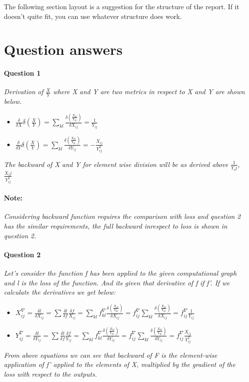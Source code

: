 \documentclass[a4 paper]{article}
\begin{document}

The following section layout is a suggestion for the structure of the report. If it doesn't quite fit, you can use whatever structure does work.

\section{Question answers}
\paragraph{Question 1} \textit{Derivation of $\frac{X}{Y}$ where X and Y are two metrics in respect to X and Y are shown below.}
\begin{itemize}
    \item $\frac{\delta}{\delta X} \delta(\frac{X}{Y}) = \sum_{kl} \frac{\delta(\frac{X_{kl}}{Y_{kl}})}{\delta X_{ij}} = \frac{1}{Y_{ij}}$
    \item $\frac{\delta}{\delta Y} \delta(\frac{X}{Y}) = \sum_{kl} \frac{\delta(\frac{X_{kl}}{Y_{kl}})}{\delta Y_{ij}} = - \frac{X_{ij}}{Y_{ij}^2}$
\end{itemize}
\textit{The backward of X and Y for element wise division will be as derived above $\frac{1}{Y_ij}$, $\frac{X_ij}{Y_{ij}^2}$}
\paragraph{Note:} \textit{Considering backward function requires the comparison with loss and question 2 has the similar requirements, the full backward inrespect to loss is shown in question 2. }
\paragraph{Question 2} \textit{Let's consider the function \emph{f} has been applied to the given computational graph and \emph{l} is the loss of the function. And its given that derivative of \emph{f} if \emph{f'}. If we calculate the derivatives we get below:}
\begin{itemize}
    \item $X_{ij}^\nabla = \frac{\delta l}{\delta X_{ij}} = \sum \frac{\delta l}{\delta f} \frac{\delta f}{X_{ij}} = \sum_{kl} f_{kl}^\nabla \frac{\delta(\frac{X_{kl}}{Y_{kl}})}{\delta X_{ij}} =  f_{ij}^\nabla  \sum_{kl} \frac{\delta(\frac{X_{kl}}{Y_{kl}})}{\delta X_{ij}} = f_{ij}^\nabla \frac{1}{Y_{ij}} $
    \item $Y_{ij}^\nabla = \frac{\delta l}{\delta Y_{ij}} = \sum \frac{\delta l}{\delta f} \frac{\delta f}{Y_{ij}} = \sum_{kl} f_{kl}^\nabla \frac{\delta(\frac{X_{kl}}{Y_{kl}})}{\delta Y_{ij}} =  f_{ij}^\nabla  \sum_{kl} \frac{\delta(\frac{X_{kl}}{Y_{kl}})}{\delta Y_{ij}} = f_{ij}^\nabla \frac{X_{ij}}{Y_{ij}^2}$ 
\end{itemize}
\textit{From above equations we can see that backward of F is the element-wise application of f' applied to the elements of X, multiplied by the gradient of the loss with respect to the outputs.}
\end{document}
